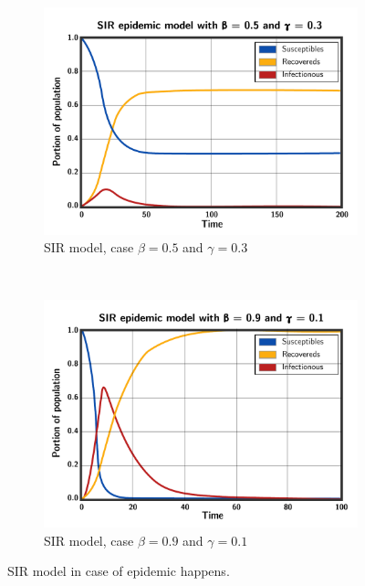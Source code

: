 \documentclass[a4paper,12pt]{article}
\begin{document}
\begin{figure}[h!]
  \centering
  \begin{subfigure}[b]{0.45\textwidth}
    \includegraphics[width=\textwidth]{epidemic1}
    \caption{SIR model, case $\beta = 0.5$ and $\gamma = 0.3$}
  \end{subfigure}
~
\begin{subfigure}[b]{0.45\textwidth}
    \includegraphics[width=\textwidth]{epidemic2}
    \caption{SIR model, case $\beta = 0.9$ and $\gamma = 0.1$}
  \end{subfigure}
  \caption{SIR model in case of epidemic happens.}
\end{figure}
\end{document}
